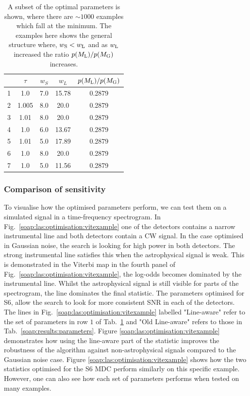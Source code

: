%
\begin{table}[h]
	\centering
	\caption[Subset of S6 optimal parameters.]{ A subset of the optimal parameters is shown, where there are $\sim 1000$ examples which fall at the minimum. The examples here shows the general structure where, $w_{\rm{S}} < w_{\rm{L}}$ and as $w_{\rm{L}}$ increased the ratio $p(M_{\rm{L}})/p(M_{\rm{G}})$ increases. \label{soap:las:optimisation:opttable} }
	\bgroup
	\def\arraystretch{1.5}
	\centering
	\begin{tabular}{c c c c c}
		\hline
		\hline
		 & $\tau$ & $w_S$ & $w_L$ & $p(M_{\rm{L}})/p(M_{\rm{G}})$ \\
		\hline
		1 & 1.0 & 7.0 & 15.78 & 0.2879\\
		\hline
		2 & 1.005 & 8.0 & 20.0 & 0.2879\\
        \hline
        3 & 1.01 & 8.0 & 20.0 & 0.2879\\
        \hline
        4 & 1.0 & 6.0 & 13.67 & 0.2879\\
        \hline
        5 & 1.01 & 5.0 & 17.89 & 0.2879\\
        \hline
        6 & 1.0 & 8.0 & 20.0 & 0.2879\\
        \hline
        7 & 1.0 & 5.0 & 11.56 & 0.2879\\
        \hline
	\end{tabular}
	\egroup
\end{table}
%

\subsubsection{\label{soap:las:optimisation:comp_sens}Comparison of sensitivity}

To visualise how the optimised parameters perform, we can test them on a simulated signal
in a time-frequency spectrogram. In Fig.~\ref{soap:las:optimisation:vitexample} one of the detectors contains a narrow instrumental line and both detectors contain a \gls{CW} signal.
In the case optimised in Gaussian noise, the search is looking for high power in both
detectors. The strong instrumental line satisfies this when the astrophysical
signal is weak. 
This is demonstrated in the Viterbi map in the fourth panel of Fig.~\ref{soap:las:optimisation:vitexample}, the log-odds becomes dominated by the instrumental line. Whilst the astrophysical signal is still visible for parts of the spectrogram, the line dominates the final statistic.
The parameters optimised for S6, allow the search to look for more consistent \gls{SNR} in each of the detectors. 
The lines in Fig.~\ref{soap:las:optimisation:vitexample} labelled "Line-aware" refer to the set of parameters in row $1$ of Tab.~\ref{soap:las:optimisation:opttable} and "Old Line-aware" refers to those in Tab.~\ref{soap:results:parameters}. 
Figure \ref{soap:las:optimisation:vitexample} demonstrates how using the line-aware part of the statistic improves the robustness of the
algorithm against non-astrophysical signals compared to the Gaussian noise case.
Figure \ref{soap:las:optimisation:vitexample} shows how the two statistics optimised for the S6 \gls{MDC} perform similarly on this specific example.
However, one can also see how each set of parameters performs when tested on many examples. 

